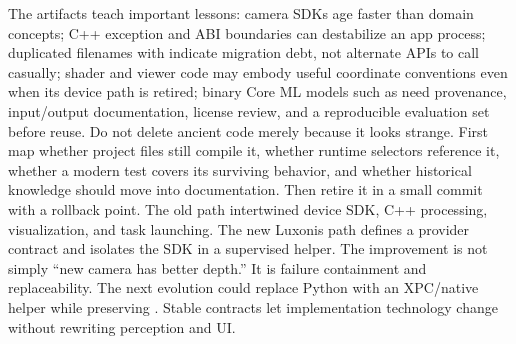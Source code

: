 {}The artifacts teach important lessons:\markdownRendererInterblockSeparator
{}\markdownRendererUlBegin
\markdownRendererUlItem camera SDKs age faster than domain concepts;\markdownRendererUlItemEnd 
\markdownRendererUlItem C++ exception and ABI boundaries can destabilize an app process;\markdownRendererUlItemEnd 
\markdownRendererUlItem duplicated filenames with  indicate migration debt, not alternate APIs to call casually;\markdownRendererUlItemEnd 
\markdownRendererUlItem shader and viewer code may embody useful coordinate conventions even when its device path is retired;\markdownRendererUlItemEnd 
\markdownRendererUlItem binary Core ML models such as  need provenance, input/output documentation, license review, and a reproducible evaluation set before reuse.\markdownRendererUlItemEnd 
\markdownRendererUlEnd \markdownRendererInterblockSeparator
{}Do not delete ancient code merely because it looks strange. First map whether project files still compile it, whether runtime selectors reference it, whether a modern test covers its surviving behavior, and whether historical knowledge should move into documentation. Then retire it in a small commit with a rollback point.\markdownRendererInterblockSeparator
{}
\markdownRendererSectionEnd \markdownRendererSectionBegin
{}\markdownRendererInterblockSeparator
{}The old path intertwined device SDK, C++ processing, visualization, and task launching. The new Luxonis path defines a provider contract and isolates the SDK in a supervised helper. The improvement is not simply “new camera has better depth.” It is failure containment and replaceability.\markdownRendererInterblockSeparator
{}\markdownRendererInterblockSeparator
{}The next evolution could replace Python with an XPC/native helper while preserving . Stable contracts let implementation technology change without rewriting perception and UI.\markdownRendererInterblockSeparator
